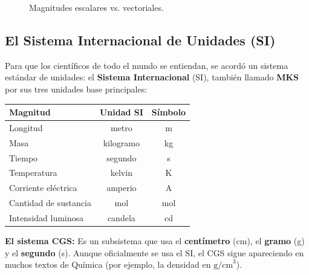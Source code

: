 \documentclass[12pt, a4paper]{article}
\begin{document}
\begin{figure}[h!]
  \caption{Magnitudes escalares vs. vectoriales.}
  \label{fig:magnitudes}
\end{figure}

\subsection{El Sistema Internacional de Unidades (SI)}

Para que los científicos de todo el mundo se entiendan, se acordó un sistema estándar de unidades: el \textbf{Sistema Internacional} (SI), también llamado \textbf{MKS} por sus tres unidades base principales:

\begin{center}
\begin{tabular}{lcc}
\toprule
\textbf{Magnitud} & \textbf{Unidad SI} & \textbf{Símbolo} \\
\midrule
Longitud & metro & m \\
Masa & kilogramo & kg \\
Tiempo & segundo & s \\
Temperatura & kelvin & K \\
Corriente eléctrica & amperio & A \\
Cantidad de sustancia & mol & mol \\
Intensidad luminosa & candela & cd \\
\bottomrule
\end{tabular}
\end{center}

\begin{cuadroadvertencia}
\textbf{El sistema CGS:} Es un subsistema que usa el \textbf{centímetro} (cm), el \textbf{gramo} (g) y el \textbf{segundo} (s). Aunque oficialmente se usa el SI, el CGS sigue apareciendo en muchos textos de Química (por ejemplo, la densidad en $\text{g/cm}^3$).
\end{cuadroadvertencia}
\end{document}
